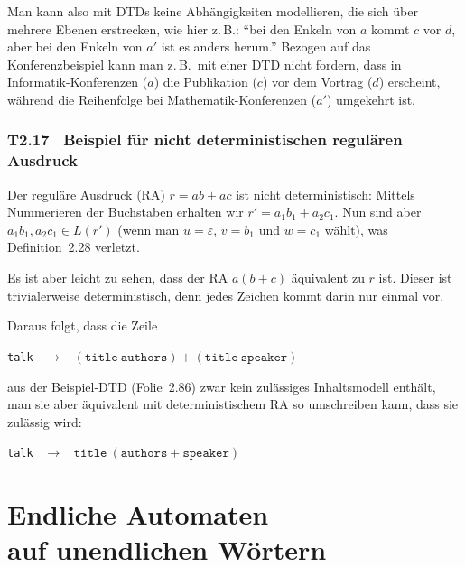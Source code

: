 \documentclass[fontsize=11pt, twoside=false, numbers=autoenddot]{scrbook}
\begin{document}
%
Man kann also mit DTDs keine Abhängigkeiten modellieren, die sich über mehrere Ebenen erstrecken,
wie hier z.\,B.: "`bei den Enkeln von $a$ kommt $c$ vor $d$, aber bei den Enkeln von $a'$ ist es anders herum."'
Bezogen auf das Konferenzbeispiel kann man z.\,B.\ mit einer DTD nicht fordern,
dass in Informatik-Konferenzen ($a$) die Publikation ($c$) vor dem Vortrag ($d$) erscheint,
während die Reihenfolge bei Mathematik-Konferenzen ($a'$) umgekehrt ist.

\section*{T2.17~ Beispiel für nicht deterministischen regulären Ausdruck}

Der reguläre Ausdruck (RA) $r = ab + ac$ ist nicht deterministisch:
Mittels Nummerieren der Buchstaben erhalten wir $r' = a_1b_1 + a_2c_1$.
Nun sind aber $a_1b_1,a_2c_1 \in L(r')$ (wenn man $u = \varepsilon$, $v=b_1$ und $w=c_1$ wählt),
was Definition~2.28 verletzt.

Es ist aber leicht zu sehen, dass der RA $a(b+c)$
äquivalent zu $r$ ist. Dieser ist trivialerweise deterministisch,
denn jedes Zeichen kommt darin nur einmal vor.

Daraus folgt, dass die Zeile 
%
\begin{center}
  \texttt{talk} ~$\to$~ $(\texttt{title}~\texttt{authors}) + (\texttt{title}~\texttt{speaker})$
\end{center}
%
aus der Beispiel-DTD (Folie~2.86) zwar kein zulässiges Inhaltsmodell enthält,
man sie aber äquivalent mit deterministischem RA so umschreiben kann, dass sie zulässig wird:
%
\begin{center}
  \texttt{talk} ~$\to$~ $\texttt{title}~(\texttt{authors} + \texttt{speaker})$
\end{center}
%


\part[Endliche Automaten auf unendlichen Wörtern]{Endliche Automaten \\ auf unendlichen Wörtern}

\end{document}
